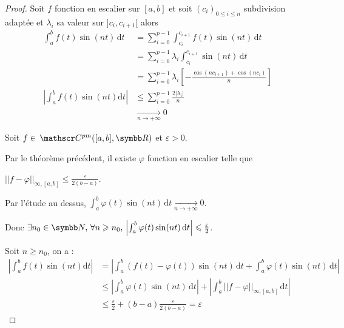 
\begin{proof}
    Soit $f$ fonction en escalier sur $[a, b]$ et soit $(c_i)_{0 \leqslant i \leqslant n}$ 
    subdivision adaptée et $\lambda_i$ sa valeur sur $]c_i, c_{i + 1}[$ alors 
    \begin{align}
        \int_{a }^{b } f(t) \sin(nt) \,\mathrm{d}t & = \sum_{i = 0}^{p - 1} \int_{c_i}^{c_{i + 1}} f(t) \sin(nt) \,\mathrm{d}t \\
        & = \sum_{i = 0}^{p - 1} \lambda_i \int_{c_i}^{c_{i + 1}} \sin(nt) \,\mathrm{d}t \\
        & = \sum_{i = 0}^{p - 1} \lambda_i \left[ - \frac{\cos(nc_{i + 1}) + \cos(nc_i)}{n} \right] \\
        \left| \int_{a }^{b } f(t) \sin(nt) \mathrm d t  \right| & \leqslant \sum_{i = 0 }^{p - 1} \frac{2 |\lambda_i|}{n} \\
        & \xrightarrow[n \to + \infty ]{} 0
    \end{align}

    Soit $f \in \mc{pm}([a, b], \R)$ et $\varepsilon > 0$.

    Par le théorème précédent, il existe $\varphi$ fonction en escalier telle que 
    
    $||f - \varphi||_{\infty, [a, b]} \leqslant \frac \varepsilon {2 (b - a)}$.

    Par l'étude au dessus, $\int_{a }^{b } \varphi(t) \sin(nt) \,\mathrm{d}t \xrightarrow[n \to + \infty ]{} 0$.

    Donc $\exists n_0 \in \N, \, \forall n \geqslant n_0, \, \left| \int_{a }^{b } \varphi(t) \sin(nt) \,\mathrm{d}t \right| \leqslant \frac \varepsilon 2$.

    Soit $n \geqslant n_0$, on a :
    \begin{align}
        \left| \int_a^b f(t) \sin(nt) \mathrm d t  \right| & = \left| \int_a^b (f(t) - \varphi(t)) \sin(nt) \,\mathrm{d}t + \int_a^b \varphi(t) \sin(nt) \,\mathrm{d}t \right| \\
        & \leqslant \left| \int_a^b \varphi(t) \sin(nt) \,\mathrm{d}t \right| + \left| \int_a^b ||f - \varphi||_{\infty, [a, b]} \,\mathrm{d}t \right| \\
        & \leqslant \frac \varepsilon 2 + (b - a) \frac \varepsilon {2 (b - a)} = \varepsilon
    \end{align}

\end{proof}

